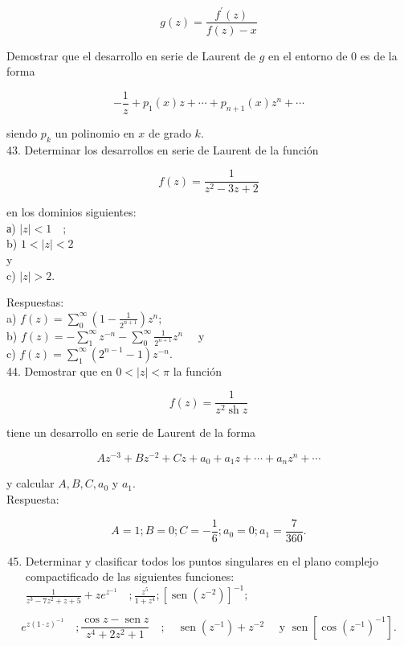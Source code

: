 \documentclass[10pt]{article}
\theoremstyle{plain}
\theoremstyle{definition}
\theoremstyle{remark}
\begin{document}
$$
g(z)=\frac{f^{\prime}(z)}{f(z)-x}
$$

Demostrar que el desarrollo en serie de Laurent de $g$ en el entorno de 0 es de la forma

$$
-\frac{1}{z}+p_{1}(x) z+\cdots+p_{n+1}(x) z^{n}+\cdots
$$

siendo $p_{k}$ un polinomio en $x$ de grado $k$.\\
43. Determinar los desarrollos en serie de Laurent de la función

$$
f(z)=\frac{1}{z^{2}-3 z+2}
$$

en los dominios siguientes:\\
а) $|z|<1 \quad$;\\
b) $1<|z|<2$\\
y\\
c) $|z|>2$.

Respuestas:\\
a) $f(z)=\sum_{0}^{\infty}\left(1-\frac{1}{2^{n+1}}\right) z^{n}$;\\
b) $f(z)=-\sum_{1}^{\infty} z^{-n}-\sum_{0}^{\infty} \frac{1}{2^{n+1}} z^{n} \quad$ y\\
c) $f(z)=\sum_{1}^{\infty}\left(2^{n-1}-1\right) z^{-n}$.\\
44. Demostrar que en $0<|z|<\pi$ la función

$$
f(z)=\frac{1}{z^{2} \operatorname{sh} z}
$$

tiene un desarrollo en serie de Laurent de la forma

$$
A z^{-3}+B z^{-2}+C z+a_{0}+a_{1} z+\cdots+a_{n} z^{n}+\cdots
$$

y calcular $A, B, C, a_{0}$ y $a_{1}$.\\
Respuesta:

$$
A=1 ; B=0 ; C=-\frac{1}{6} ; a_{0}=0 ; a_{1}=\frac{7}{360} .
$$

\begin{enumerate}
  \setcounter{enumi}{44}
  \item Determinar y clasificar todos los puntos singulares en el plano complejo compactificado de las siguientes funciones:\\
$\frac{1}{z^{3}-7 z^{2}+z+5}+z e^{z^{-1}} \quad ; \frac{z^{5}}{1+z^{4}} ;\left[\operatorname{sen}\left(z^{-2}\right)\right]^{-1} ;$
\end{enumerate}

$$
e^{z(1 \cdot z)^{-1}} \quad ; \frac{\cos z-\operatorname{sen} z}{z^{4}+2 z^{2}+1} \quad ; \quad \operatorname{sen}\left(z^{-1}\right)+z^{-2} \quad \text { y } \operatorname{sen}\left[\cos \left(z^{-1}\right)^{-1}\right] .
$$
\end{document}
